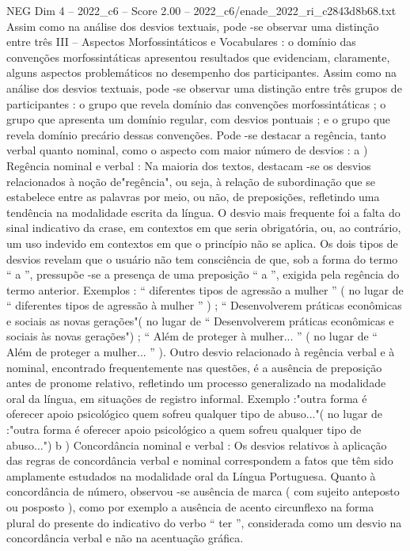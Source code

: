 \begin{textsample}{NEG Dim 4 – 2022\_c6 – Score 2.00 – 2022\_c6/enade\_2022\_ri\_c2843d8b68.txt}
Assim como na análise dos desvios textuais, pode -se observar uma distinção entre três III – Aspectos Morfossintáticos e Vocabulares : o domínio das convenções morfossintáticas apresentou resultados que evidenciam, claramente, alguns aspectos problemáticos no desempenho dos participantes.
Assim como na análise dos desvios textuais, pode -se observar uma distinção entre três grupos de participantes : o grupo que revela domínio das convenções morfossintáticas ; o grupo que apresenta um domínio regular, com desvios pontuais ; e o grupo que revela domínio precário dessas convenções.
Pode -se destacar a regência, tanto verbal quanto nominal, como o aspecto com maior número de desvios : a ) Regência nominal e verbal : Na maioria dos textos, destacam -se os desvios relacionados à noção de"regência", ou seja, à relação de subordinação que se estabelece entre as palavras por meio, ou não, de preposições, refletindo uma tendência na modalidade escrita da língua.
O desvio mais frequente foi a falta do sinal indicativo da crase, em contextos em que seria obrigatória, ou, ao contrário, um uso indevido em contextos em que o princípio não se aplica.
Os dois tipos de desvios revelam que o usuário não tem consciência de que, sob a forma do termo “ a ”, pressupõe -se a presença de uma preposição “ a ”, exigida pela regência do termo anterior.
Exemplos : “ diferentes tipos de agressão a mulher ” ( no lugar de “ diferentes tipos de agressão à mulher ” ) ; “ Desenvolverem práticas econômicas e sociais as novas gerações"( no lugar de “ Desenvolverem práticas econômicas e sociais às novas gerações") ; “ Além de proteger à mulher... ” ( no lugar de “ Além de proteger a mulher... ” ).
Outro desvio relacionado à regência verbal e à nominal, encontrado frequentemente nas questões, é a ausência de preposição antes de pronome relativo, refletindo um processo generalizado na modalidade oral da língua, em situações de registro informal.
Exemplo :"outra forma é oferecer apoio psicológico quem sofreu qualquer tipo de abuso..."( no lugar de :"outra forma é oferecer apoio psicológico a quem sofreu qualquer tipo de abuso...") b ) Concordância nominal e verbal : Os desvios relativos à aplicação das regras de concordância verbal e nominal correspondem a fatos que têm sido amplamente estudados na modalidade oral da Língua Portuguesa.
Quanto à concordância de número, observou -se ausência de marca ( com sujeito anteposto ou posposto ), como por exemplo a ausência de acento circunflexo na forma plural do presente do indicativo do verbo “ ter ”, considerada como um desvio na concordância verbal e não na acentuação gráfica.

\end{textsample}
